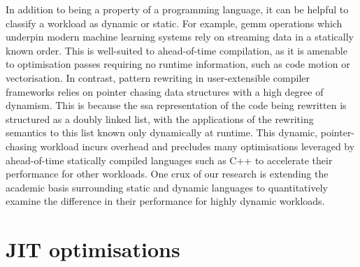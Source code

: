 
In addition to being a property of a programming language, it can be helpful to classify a workload as dynamic or static.
For example, \ac{gemm} operations which underpin modern machine learning systems rely on streaming data in a statically known order. This is well-suited to ahead-of-time compilation, as it is amenable to optimisation passes requiring no runtime information, such as code motion or vectorisation.
In contrast, pattern rewriting in user-extensible compiler frameworks relies on pointer chasing data structures with a high degree of dynamism. This is because the \ac{ssa} representation of the code being rewritten is structured as a doubly linked list, with the applications of the rewriting semantics to this list known only dynamically at runtime.
This dynamic, pointer-chasing workload incurs overhead and precludes many optimisations leveraged by ahead-of-time statically compiled languages such as C++ to accelerate their performance for other workloads.
One crux of our research is extending the academic basis surrounding static and dynamic languages to quantitatively examine the difference in their performance for highly dynamic workloads.







\section{JIT optimisations}
\label{sec:jit-optimisations}

